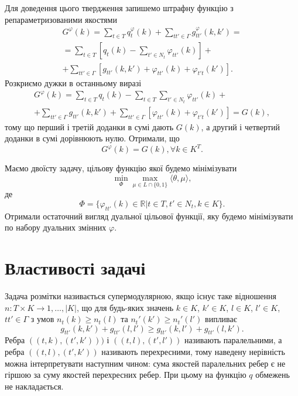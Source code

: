 Для доведення цього твердження запишемо штрафну функцію з репараметризованими
якостями 
\begin{equation}
  \begin{aligned}
  G^{\varphi}(k) =  \sum\limits_{t\in T} q^{\varphi}_t(k)+
  \sum\limits_{tt'\in \Gamma} g^{\varphi}_{tt'}(k,k')=\\
  =\sum\limits_{t\in T}  \left[ q_t(k)- \sum\limits_{t'\in N_t} \varphi_{tt'}(k) \right]+\\
  +\sum\limits_{tt'\in \Gamma} \left[g_{tt'}(k,k') + \varphi_{tt'}(k) + \varphi_{t't}(k') \right].
  \end{aligned}
\end{equation}
Розкриємо дужки в останньому виразі
\begin{equation}
  \begin{aligned}
  G^{\varphi}(k) =  \sum\limits_{t\in T} q_t(k)-\sum\limits_{t\in T}\sum\limits_{t'\in N_t}\varphi_{tt'}(k)+\\
  +\sum\limits_{tt'\in \Gamma}g_{tt'}(k,k')+\sum\limits_{tt'\in \Gamma}\left[ \varphi_{tt'}(k) + \varphi_{t't}(k')\right]=G(k),
  \end{aligned}
\end{equation}
тому що перший і третій доданки в сумі дають $G(k)$, а другий і четвертий доданки в сумі дорівнюють нулю.
Отримали, що 
\begin{equation}
  G^{\varphi}(k) = G(k), \forall k\in K^T.
\end{equation}

Маємо двоїсту задачу, цільову функцію якої будемо мінімізувати
\begin{equation}
  \min_{\Phi}\max_{\mu\in L\cap \{0,1\}}\langle\theta,\mu\rangle,
\end{equation}
де 
\begin{equation}
  \Phi = \{\varphi_{tt'}(k)\in\mathbb{R}|t\in T, t'\in N_t, k\in K\}.
\end{equation}
Отримали остаточний вигляд дуальної цільової функції, яку будемо мінімізувати
по набору дуальних змінних $\varphi$.


\section{Властивості задачі}

Задача розмітки називається супермодулярною, якщо існує таке відношення
$n:T\times K\rightarrow {1,\dots, \left\lvert K\right\rvert } $, 
що для будь-яких значень $k\in K$, $k'\in K$, $l \in K$, $l'\in K$, $tt'\in \Gamma$ з умов 
$n_t(k)\geq n_t(l)$ та $n_t'(k')\geq n_t'(l')$ випливає
\begin{equation}
    g_{tt'}(k,k') + g_{tt'}(l,l')\geq g_{tt'}(k,l') + g_{tt'}(l,k').
   \end{equation}
Ребра $((t,k),(t',k')))$ і $((t,l),(t',l'))$ називають паралельними, 
а ребра $((t,l),(t',k'))$ називають перехресними, тому наведену нерівність
можна інтерпретувати наступним чином: сума якостей паралельних ребер є не гіршою
за суму якостей перехресних ребер. При цьому на функцію $q$ обмежень не накладається.

